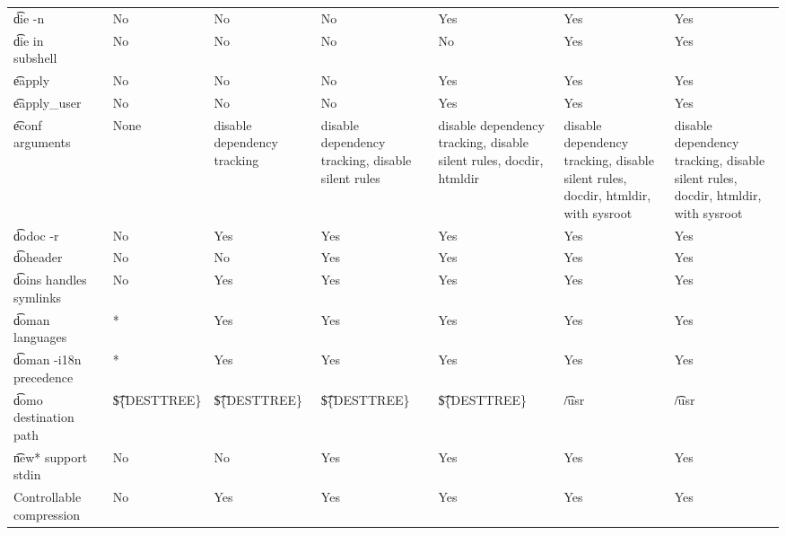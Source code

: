 \begin{landscape}
\begin{longtable}{llP{7.5em}P{7.5em}P{7.5em}P{7.5em}P{7.5em}P{7.5em}}
\t{die -n} &  &
    No & No & No & Yes & Yes & Yes \\

\t{die} in subshell &  &
    No & No & No & No & Yes & Yes \\

\t{eapply} &  &
    No & No & No & Yes & Yes & Yes \\

\t{eapply_user} &  &
    No & No & No & Yes & Yes & Yes \\

\t{econf} arguments &  &
    None & disable dependency tracking &
    disable dependency tracking, disable silent rules &
    disable dependency tracking, disable silent rules, docdir, htmldir &
    disable dependency tracking, disable silent rules, docdir, htmldir, with sysroot &
    disable dependency tracking, disable silent rules, docdir, htmldir, with sysroot \\

\t{dodoc -r} &  &
    No & Yes & Yes & Yes & Yes & Yes \\

\t{doheader} &  &
    No & No & Yes & Yes & Yes & Yes \\

\t{doins} handles symlinks &  &
    No & Yes & Yes & Yes & Yes & Yes \\

\t{doman} languages &  &
    * & Yes & Yes & Yes & Yes & Yes \\

\t{doman -i18n} precedence &  &
    * & Yes & Yes & Yes & Yes & Yes \\

\t{domo} destination path &  &
    \t{\$\{DESTTREE\}} & \t{\$\{DESTTREE\}} & \t{\$\{DESTTREE\}} & \t{\$\{DESTTREE\}} & \t{/usr} &
    \t{/usr} \\

\t{new*} support stdin &  &
    No & No & Yes & Yes & Yes & Yes \\

Controllable compression &  &
    No & Yes & Yes & Yes & Yes & Yes \\


\end{longtable}
\end{landscape}
